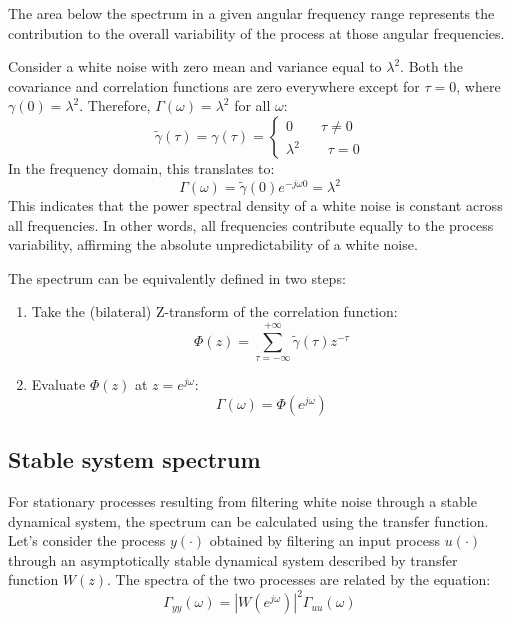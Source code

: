 The area below the spectrum in a given angular frequency range represents the contribution to the overall variability of the process at those angular frequencies.
\begin{example}
    Consider a white noise with zero mean and variance equal to $\lambda^2$. 
    Both the covariance and correlation functions are zero everywhere except for $\tau = 0$, where $\gamma(0) = \lambda^2$. 
    Therefore, $\Gamma(\omega)=\lambda^2$ for all $\omega$: 
    \[\tilde{\gamma}(\tau)=\gamma(\tau)=\begin{cases}
        0 \qquad \tau \neq 0 \\
        \lambda^2 \qquad \tau = 0
    \end{cases}\]
    In the frequency domain, this translates to:
    \[\Gamma(\omega)=\tilde{\gamma}(0)e^{-j\omega 0}=\lambda^2\]
    This indicates that the power spectral density of a white noise is constant across all frequencies. 
    In other words, all frequencies contribute equally to the process variability, affirming the absolute unpredictability of a white noise.
\end{example}
The spectrum can be equivalently defined in two steps:
\begin{enumerate}
    \item Take the (bilateral) Z-transform of the correlation function:
        \[\Phi(z)=\sum_{\tau=-\infty}^{+\infty}\tilde{\gamma}(\tau)z^{-\tau}\]
    \item Evaluate $\Phi(z)$ at $z=e^{j\omega}$: 
        \[\Gamma(\omega)=\Phi(e^{j\omega})\]
\end{enumerate}

\subsection{Stable system spectrum}
For stationary processes resulting from filtering white noise through a stable dynamical system, the spectrum can be calculated using the transfer function.
Let's consider the process $y(\cdot)$ obtained by filtering an input process $u(\cdot)$ through an asymptotically stable dynamical system described by transfer function $W(z)$. 
The spectra of the two processes are related by the equation:
\[\Gamma_{yy}(\omega)=\left\lvert W(e^{j\omega})\right\rvert^2\Gamma_{uu}(\omega)\]

